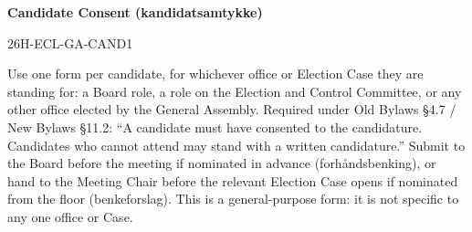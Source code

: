 \documentclass{../../../Common/Latex/Templates/rapport}
\date{\meetingdate, \meetingtime}
\begin{document}
\reportmainmatter
\small
\setlength{\parindent}{0pt}
\setlength{\tabcolsep}{6pt}
\renewcommand{\arraystretch}{1.2}

\begin{center}
  {\Large\bfseries Candidate Consent (kandidatsamtykke)}\par
  \vspace{0.15cm}
  {\normalsize 26H-ECL-GA-CAND1}\par
  \vspace{0.1cm}
  {\small \meetingline}\par
\end{center}

\vspace{0.2cm}
Use one form per candidate, for whichever office or Election Case they are standing for: a Board role, a role on the Election and Control Committee, or any other office elected by the General Assembly. Required under Old Bylaws \S4.7 / New Bylaws \S11.2: ``A candidate must have consented to the candidature. Candidates who cannot attend may stand with a written candidature.'' Submit to the Board before the meeting if nominated in advance (forhåndsbenking), or hand to the Meeting Chair before the relevant Election Case opens if nominated from the floor (benkeforslag). This is a general-purpose form: it is not specific to any one office or Case.
\end{document}

